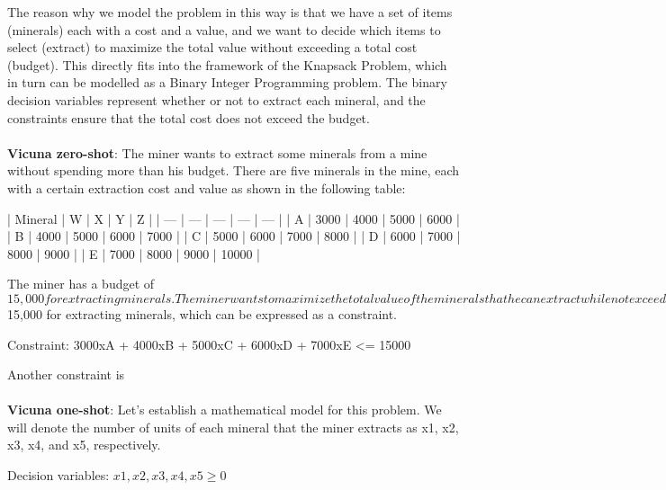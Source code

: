 \documentclass{article}%
\begin{document}
The reason why we model the problem in this way is that we have a set of items (minerals) each with a cost and a value, and we want to decide which items to select (extract) to maximize the total value without exceeding a total cost (budget). This directly fits into the framework of the Knapsack Problem, which in turn can be modelled as a Binary Integer Programming problem. The binary decision variables represent whether or not to extract each mineral, and the constraints ensure that the total cost does not exceed the budget.\\\\%
\textbf{Vicuna zero-shot}: The miner wants to extract some minerals from a mine without spending more than his budget. There are five minerals in the mine, each with a certain extraction cost and value as shown in the following table:

| Mineral | W | X | Y | Z |
| --- | --- | --- | --- | --- |
| A | 3000 | 4000 | 5000 | 6000 |
| B | 4000 | 5000 | 6000 | 7000 |
| C | 5000 | 6000 | 7000 | 8000 |
| D | 6000 | 7000 | 8000 | 9000 |
| E | 7000 | 8000 | 9000 | 10000 |

The miner has a budget of $15,000 for extracting minerals. The miner wants to maximize the total value of the minerals that he can extract while not exceeding his budget.

To model this problem, we can define the decision variables as the number of minerals of each type that the miner chooses to extract. Let's denote the number of mineral A, B, C, D, and E that the miner chooses to extract by xA, xB, xC, xD, and xE respectively.

The objective function is to maximize the total value of the minerals that the miner extracts, which is equal to the sum of the values of the extracted minerals.

Maximize: 1500xA + 2000xB + 2500xC + 3000xD + 3500xE

The miner has a budget of $15,000 for extracting minerals, which can be expressed as a constraint.

Constraint: 3000xA + 4000xB + 5000xC + 6000xD + 7000xE <= 15000

Another constraint is\\\\%
\textbf{Vicuna one-shot}: Let's establish a mathematical model for this problem. We will denote the number of units of each mineral that the miner extracts as x1, x2, x3, x4, and x5, respectively.

Decision variables:
$x1, x2, x3, x4, x5 \geq 0$
\end{document}
